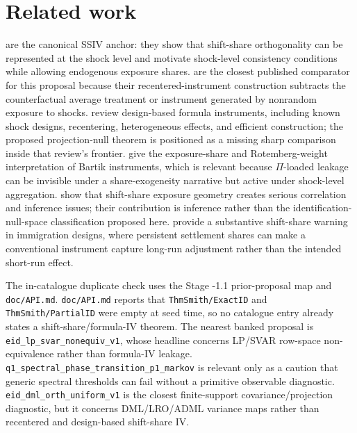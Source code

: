 \documentclass[11pt]{article}
\theoremstyle{definition}
\theoremstyle{plain}
\theoremstyle{remark}
\begin{document}
\section{Related work}
\citet{BorusyakHullJaravel2022REStud} are the canonical SSIV anchor: they show that shift-share orthogonality can be represented at the shock level and motivate shock-level consistency conditions while allowing endogenous exposure shares.  \citet{BorusyakHull2023Econometrica} are the closest published comparator for this proposal because their recentered-instrument construction subtracts the counterfactual average treatment or instrument generated by nonrandom exposure to shocks.  \citet{BorusyakHullJaravel2025ECTJ} review design-based formula instruments, including known shock designs, recentering, heterogeneous effects, and efficient construction; the proposed projection-null theorem is positioned as a missing sharp comparison inside that review's frontier.  \citet{GoldsmithPinkhamSorkinSwift2020AER} give the exposure-share and Rotemberg-weight interpretation of Bartik instruments, which is relevant because \(\Pi\)-loaded leakage can be invisible under a share-exogeneity narrative but active under shock-level aggregation.  \citet{AdaoKolesarMorales2019QJE} show that shift-share exposure geometry creates serious correlation and inference issues; their contribution is inference rather than the identification-null-space classification proposed here.  \citet{JaegerRuistStuhler2018NBER} provide a substantive shift-share warning in immigration designs, where persistent settlement shares can make a conventional instrument capture long-run adjustment rather than the intended short-run effect.

The in-catalogue duplicate check uses the Stage -1.1 prior-proposal map and \texttt{doc/API.md}.  \texttt{doc/API.md} reports that \texttt{ThmSmith/ExactID} and \texttt{ThmSmith/PartialID} were empty at seed time, so no catalogue entry already states a shift-share/formula-IV theorem.  The nearest banked proposal is \texttt{eid\_lp\_svar\_nonequiv\_v1}, whose headline concerns LP/SVAR row-space non-equivalence rather than formula-IV leakage.  \texttt{q1\_spectral\_phase\_transition\_p1\_markov} is relevant only as a caution that generic spectral thresholds can fail without a primitive observable diagnostic.  \texttt{eid\_dml\_orth\_uniform\_v1} is the closest finite-support covariance/projection diagnostic, but it concerns DML/LRO/ADML variance maps rather than recentered and design-based shift-share IV.
\end{document}
